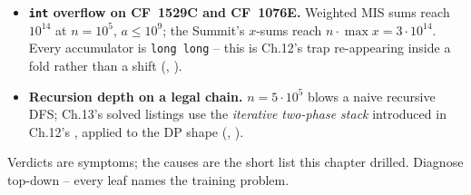 \begin{itemize}[nosep, leftmargin=1.4em]
  \item \textbf{\lstinline{int} overflow on CF~1529C and CF~1076E.}
        Weighted MIS sums reach $10^{14}$ at $n=10^{5}$, $a\le 10^{9}$;
        the Summit's $x$-sums reach $n \cdot \max x = 3\cdot10^{14}$.
        Every accumulator is \lstinline{long long} -- this is Ch.12's
        trap re-appearing inside a fold rather than a shift
        (, ).
  \item \textbf{Recursion depth on a legal chain.} $n=5\cdot10^{5}$
        blows a naive recursive DFS; Ch.13's solved listings use the
        \emph{iterative two-phase stack} introduced in Ch.12's
        , applied to the DP shape (,
        ).
\end{itemize}


Verdicts are symptoms; the causes are the short list this chapter
drilled. Diagnose top-down -- every leaf names the training problem.


